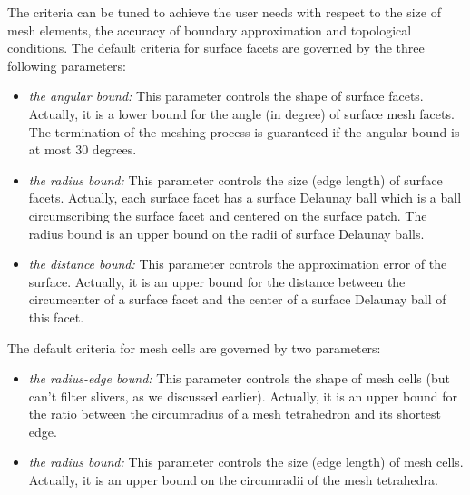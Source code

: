 The criteria can  be tuned  to achieve the user needs with respect to
the size of mesh elements, the accuracy of boundary approximation
and topological conditions.
The default criteria  for surface facets are governed by the three following
parameters:
%
%
%
\begin{itemize}
\item \emph{the angular bound:} This parameter controls the shape of  
  surface facets. Actually, it is a lower bound for the angle (in degree) of
   surface mesh facets. The termination  of the meshing process is
guaranteed  if the angular bound is at most 30
  degrees. 
\item \emph{the radius bound:}  This parameter controls the size (edge
  length) of surface facets. Actually, each surface facet has 
a surface Delaunay ball which is a ball circumscribing the surface facet and
  centered on the surface patch.
 The radius bound is an upper 
  bound on the radii of surface Delaunay balls.
 \item \emph{the distance bound:}  This parameter controls the approximation error of the surface.
 Actually, it is an upper bound for the distance between the circumcenter
 of a surface facet and the center of a surface Delaunay ball of this facet.
\end{itemize}

The default criteria for mesh cells are governed by two parameters:
\begin{itemize}
\item \emph{the radius-edge bound:}   This parameter controls the
  shape of mesh cells (but can't filter slivers, as we discussed earlier).
 Actually, it is an upper bound for the ratio
 between the circumradius of a 
   mesh tetrahedron and its shortest edge.
\item \emph{the radius bound:}  This parameter controls the size (edge length) of 
  mesh cells. Actually, it is an upper bound on the circumradii of the
 mesh tetrahedra.
\end{itemize}

